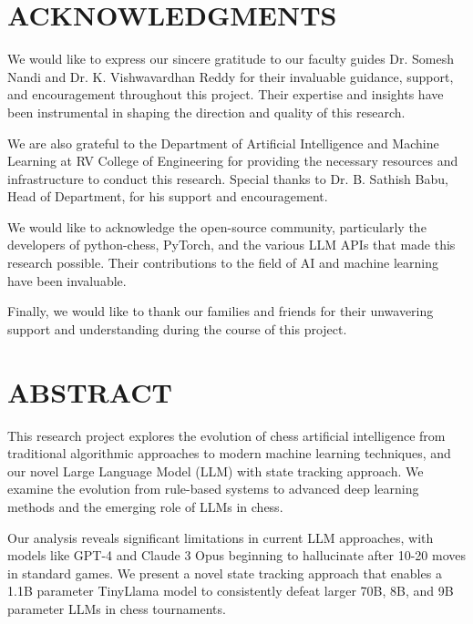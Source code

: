 \documentclass[11pt,a4paper]{report}
\begin{document}
\vspace{0.3cm}
\chapter*{ACKNOWLEDGMENTS}
\thispagestyle{fancy}

We would like to express our sincere gratitude to our faculty guides Dr. Somesh Nandi and Dr. K. Vishwavardhan Reddy for their invaluable guidance, support, and encouragement throughout this project. Their expertise and insights have been instrumental in shaping the direction and quality of this research.

\vspace{0.5cm}

We are also grateful to the Department of Artificial Intelligence and Machine Learning at RV College of Engineering for providing the necessary resources and infrastructure to conduct this research. Special thanks to Dr. B. Sathish Babu, Head of Department, for his support and encouragement.

\vspace{0.5cm}

We would like to acknowledge the open-source community, particularly the developers of python-chess, PyTorch, and the various LLM APIs that made this research possible. Their contributions to the field of AI and machine learning have been invaluable.

\vspace{0.5cm}

Finally, we would like to thank our families and friends for their unwavering support and understanding during the course of this project.

\vspace{0.3cm}
\chapter*{ABSTRACT}
\thispagestyle{fancy}

\vspace{0.3cm}
This research project explores the evolution of chess artificial intelligence from traditional algorithmic approaches to modern machine learning techniques, and our novel Large Language Model (LLM) with state tracking approach. We examine the evolution from rule-based systems to advanced deep learning methods and the emerging role of LLMs in chess.

Our analysis reveals significant limitations in current LLM approaches, with models like GPT-4 and Claude 3 Opus beginning to hallucinate after 10-20 moves in standard games. We present a novel state tracking approach that enables a 1.1B parameter TinyLlama model to consistently defeat larger 70B, 8B, and 9B parameter LLMs in chess tournaments.
\end{document}
